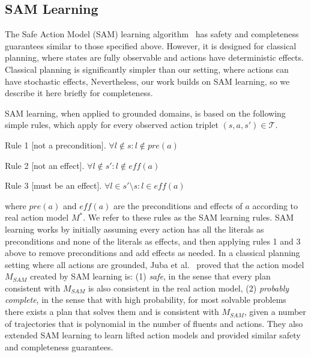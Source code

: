 \documentclass[letterpaper]{article} %
\newcommand{\eff}{\textit{eff}}
\newcommand{\pre}{\textit{pre}}
\newcommand{\sam}{\textit{SAM}}
\begin{document}






\subsection{SAM Learning}

The Safe Action Model (SAM) learning algorithm~\cite{juba2021kr,stern2017efficientAndSafe} has safety and completeness guarantees similar to those specified above. 
However, it is designed for classical planning, where states are fully observable and actions have deterministic effects. 
Classical planning is significantly simpler than our setting, where actions can have stochastic effects, 
Nevertheless, our work builds on SAM learning, so we describe it here briefly for completeness. 


SAM learning, when applied to grounded domains, is based on the following simple rules, which apply for every observed action triplet $(s,a,s')\in \mathcal{T}$.
\begin{compactenum}
    \item Rule 1 [not a precondition].  $\forall l \notin s: l \notin \pre(a)$
    \item Rule 2 [not an effect].  $\forall l \notin s': l \notin \eff(a)$
    \item Rule 3 [must be an effect].  $\forall l \in s'\setminus s: l \in \eff(a)$
\end{compactenum}
where $\pre(a)$ and $\eff(a)$ are the preconditions and effects of $a$ according to real action model $M^*$. 
We refer to these rules as the SAM learning rules. 
SAM learning works by initially assuming every action has all the literals as preconditions and none of the literals as effects, and then applying rules 1 and 3 above to remove preconditions and add effects as needed. 
In a classical planning setting where all actions are grounded, Juba et al.~ proved that the action model $M_{\sam}$ created by SAM learning is: (1) \emph{safe}, in the sense that every plan consistent with $M_{\sam}$ is also consistent in the real action model, (2) \emph{probably complete}, in the sense that with high probability, 
for most solvable problems there exists a plan that solves them and is consistent with $M_{SAM}$, given a number of trajectories that is polynomial in the number of fluents and actions. 
They also extended SAM learning to learn lifted action models and provided similar safety and completeness guarantees. 
\end{document}
